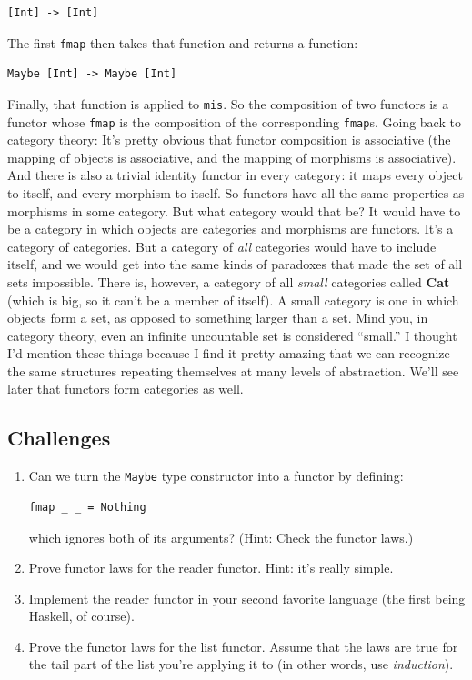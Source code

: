 \begin{verbatim}
[Int] -> [Int]
\end{verbatim}

The first \texttt{fmap} then takes that function and returns a function:

\begin{verbatim}
Maybe [Int] -> Maybe [Int]
\end{verbatim}

Finally, that function is applied to \texttt{mis}. So the composition of
two functors is a functor whose \texttt{fmap} is the composition of the
corresponding \texttt{fmap}s. Going back to category theory: It's pretty
obvious that functor composition is associative (the mapping of objects
is associative, and the mapping of morphisms is associative). And there
is also a trivial identity functor in every category: it maps every
object to itself, and every morphism to itself. So functors have all the
same properties as morphisms in some category. But what category would
that be? It would have to be a category in which objects are categories
and morphisms are functors. It's a category of categories. But a
category of \emph{all} categories would have to include itself, and we
would get into the same kinds of paradoxes that made the set of all sets
impossible. There is, however, a category of all \emph{small} categories
called \textbf{Cat} (which is big, so it can't be a member of itself). A
small category is one in which objects form a set, as opposed to
something larger than a set. Mind you, in category theory, even an
infinite uncountable set is considered ``small.'' I thought I'd mention
these things because I find it pretty amazing that we can recognize the
same structures repeating themselves at many levels of abstraction.
We'll see later that functors form categories as well.

\subsection{Challenges}\label{challenges}

\begin{enumerate}
\item
  Can we turn the \texttt{Maybe} type constructor into a functor by
  defining:

\begin{verbatim}
fmap _ _ = Nothing
\end{verbatim}

  which ignores both of its arguments? (Hint: Check the functor laws.)
\item
  Prove functor laws for the reader functor. Hint: it's really simple.
\item
  Implement the reader functor in your second favorite language (the
  first being Haskell, of course).
\item
  Prove the functor laws for the list functor. Assume that the laws are
  true for the tail part of the list you're applying it to (in other
  words, use \emph{induction}).
\end{enumerate}


